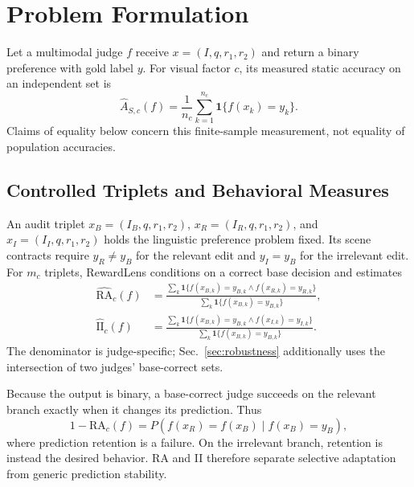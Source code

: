 \section{Problem Formulation}
\label{sec:problem_formulation}

Let a multimodal judge $f$ receive $x=(I,q,r_1,r_2)$ and return a binary
preference with gold label $y$. For visual factor $c$, its measured static
accuracy on an independent set is
\begin{equation}
\widehat{A}_{S,c}(f)=\frac{1}{n_c}\sum_{k=1}^{n_c}
\mathbf{1}\{f(x_k)=y_k\}.
\label{eq:emp_static_accuracy}
\end{equation}
Claims of equality below concern this finite-sample measurement, not equality
of population accuracies.

\subsection{Controlled Triplets and Behavioral Measures}
\label{sec:intervention_triplets}
\label{sec:intervention_behavior}

An audit triplet
$x_B=(I_B,q,r_1,r_2)$, $x_R=(I_R,q,r_1,r_2)$, and
$x_I=(I_I,q,r_1,r_2)$ holds the linguistic preference problem fixed. Its scene
contracts require $y_R\neq y_B$ for the relevant edit and $y_I=y_B$ for the
irrelevant edit. For $m_c$ triplets, RewardLens conditions on a correct base
decision and estimates
\begin{align}
\widehat{\mathrm{RA}}_c(f)
&=\frac{\sum_k\mathbf{1}\{f(x_{B,k})=y_{B,k}\land
f(x_{R,k})=y_{R,k}\}}{\sum_k\mathbf{1}\{f(x_{B,k})=y_{B,k}\}},
\label{eq:emp_ra}\\
\widehat{\mathrm{II}}_c(f)
&=\frac{\sum_k\mathbf{1}\{f(x_{B,k})=y_{B,k}\land
f(x_{I,k})=y_{I,k}\}}{\sum_k\mathbf{1}\{f(x_{B,k})=y_{B,k}\}}.
\label{eq:emp_ii}
\end{align}
The denominator is judge-specific; Sec.~\ref{sec:robustness} additionally uses
the intersection of two judges' base-correct sets.

Because the output is binary, a base-correct judge succeeds on the relevant
branch exactly when it changes its prediction. Thus
\begin{equation}
1-\mathrm{RA}_c(f)=P(f(x_R)=f(x_B)\mid f(x_B)=y_B),
\label{eq:ra_retention}
\end{equation}
where prediction retention is a failure. On the irrelevant branch, retention
is instead the desired behavior. RA and II therefore separate selective
adaptation from generic prediction stability.

